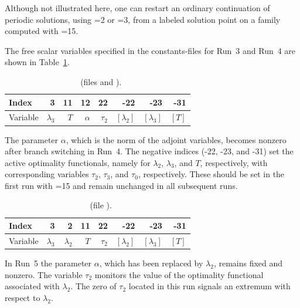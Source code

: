 \documentclass[12pt]{report}
\begin{document}
Although not illustrated here, one can restart an ordinary
continuation of periodic solutions, using =2 or =3,
from a labeled solution point on a family computed with =15.

\newpage
The free scalar variables specified in the \AUTO constants-files
for Run~3 and Run~4 are shown in  Table~\ref{tbl:demo_ops_1}.

\begin{table}[htbp]
\begin{center}
\begin{tabular}{| l | r | r | r | r | r | r | r |}
\hline
  Index& 3 & 11 & 12 & 22  & -22 & -23 & -31 \\
\hline
  Variable& $\lambda_3$ & $T$ &  $\alpha$ & $\tau_2$  
  & $[\lambda_2]$ & $[\lambda_3]$ & $[T]$ \\
\hline
\end{tabular}
\caption{~ (files  and ).}
\label{tbl:demo_ops_1}
\end{center}
\end{table}

The parameter $\alpha$, which is the norm of the adjoint variables,
becomes nonzero after branch switching in Run~4.
The negative indices (-22, -23, and -31) set the active optimality 
functionals, namely for $\lambda_2$, $\lambda_3$, and $T$, respectively,
with corresponding variables $\tau_2$, $\tau_3$, and $\tau_0$,
respectively.
These should be set in the first run with =15 and remain unchanged
in all subsequent runs.


\begin{table}[htbp]
\begin{center}
\begin{tabular}{| l | r | r | r | r | r | r | r |}
\hline
  Index& 3 & ~2 & 11 & 22  & -22 & -23 & -31 \\
\hline
  Variable& $\lambda_3$ & $\lambda_2$ & $T$ & $\tau_2$  
  & $[\lambda_2]$ & $[\lambda_3]$ & $[T]$ \\
\hline
\end{tabular}
\caption{~ (file ).}
\label{tbl:demo_ops_2}
\end{center}
\end{table}

In Run~5 the parameter $\alpha$, which has been replaced by $\lambda_2$,
remains fixed and nonzero.
The variable $\tau_2$ monitors the value of the optimality functional 
associated with $\lambda_2$.
The zero of $\tau_2$ located in this run signals an extremum  
with respect to $\lambda_2$.
\end{document}
